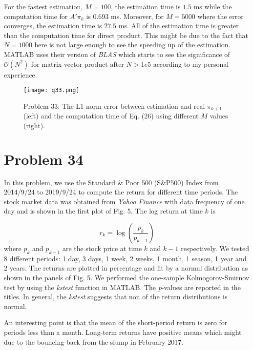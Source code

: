 \documentclass[a4paper, 11pt]{article}
\begin{document}
For the fastest estimation, $M=100$, the estimation time is $1.5$ ms while the computation time for $A'\pi_k$ is $0.693$ ms. Moreover, for $M=5000$ where the error converges, the estimation time is $27.5$ ms. All of the estimation time is greater than the computation time for direct product. This might be due to the fact that $N=1000$ here is not large enough to see the speeding up of the estimation. MATLAB uses their version of \textit{BLAS} which starts to see the significance of $\mathcal{O}(N^2)$ for matrix-vector product after $N>1e5$ according to my personal experience. 


\begin{figure}
	\begin{center}
		\texttt{[image: q33.png]}
		\caption{Problem 33: The L1-norm error between estimation and real $\pi_{k+1}$ (left) and the computation time of Eq. (26) using different $M$ values (right).  }
	\end{center}
\end{figure}


\section*{Problem 34}

In this problem, we use the Standard \& Poor 500 (S\&P500) Index from 2014/9/24 to 2019/9/24 to compute the return for different time periods. The stock market data was obtained from \textit{Yahoo Finance} with data frequency of one day and is shown in the first plot of Fig. 5. The log return at time $k$ is 

\begin{equation}
r_k = \log \left( \frac{p_k}{p_{k-1}} \right)
\end{equation}
where $p_k$ and $p_{k-1}$ are the stock price at time $k$ and $k-1$ respectively. We tested 8 different periods: 1 day, 3 days, 1 week, 2 weeks, 1 month, 1 season, 1 year and 2 years. The returns are plotted in percentage and fit by a normal distribution as shown in the panels of Fig. 5. We performed the one-sample Kolmogorov-Smirnov test by using the \textit{kstest} function in MATLAB. The \textit{p}-values are reported in the titles. In general, the \textit{kstest} suggests that non of the return distributions is normal. 

An interesting point is that the mean of the short-period return is zero for periods less than a month. Long-term returns have positive means which might due to the bouncing-back from the slump in February 2017. 
\end{document}
